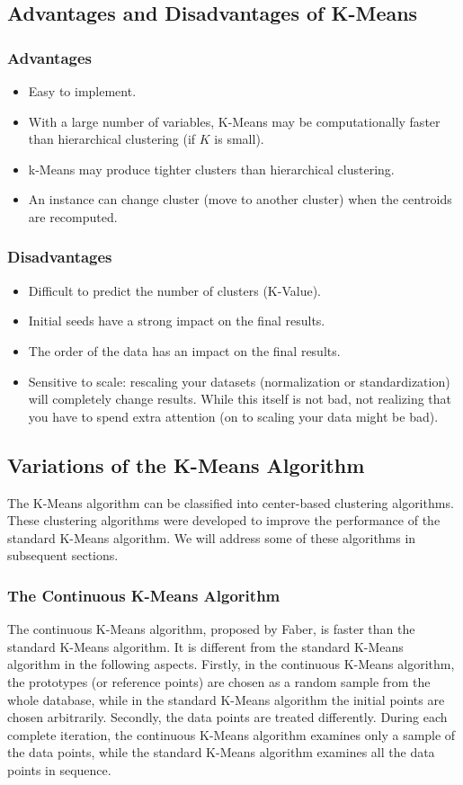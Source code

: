 \documentclass[12pt,a4paper]{article}
\begin{document}
\subsection{Advantages and Disadvantages of K-Means}
\subsubsection{Advantages}
\begin{itemize}
\item Easy to implement.
\item With a large number of variables, K-Means may be computationally faster than hierarchical clustering (if $K$ is small). 
\item k-Means may produce tighter clusters than hierarchical clustering.
\item An instance can change cluster (move to another cluster) when the centroids are recomputed.
\end{itemize}
\subsubsection{Disadvantages}
\begin{itemize}
\item Difficult to predict the number of clusters (K-Value).
\item Initial seeds have a strong impact on the final results.
\item The order of the data has an impact on the final results.
\item Sensitive to scale: rescaling your datasets (normalization or standardization) will completely change results. While this itself is not bad, not realizing that you have to spend extra attention (on to scaling your data might be bad).
\end{itemize}

\subsection{Variations of the K-Means Algorithm}
The K-Means algorithm can be classified into center-based clustering algorithms. These clustering algorithms were developed to improve the performance of the standard K-Means algorithm\cite{gan2007data}. We will address some of these algorithms in subsequent sections.
\subsubsection{The Continuous K-Means Algorithm}
The continuous K-Means algorithm, proposed by Faber, is faster than the standard K-Means algorithm. It is different from the standard K-Means algorithm in the following aspects. Firstly, in the continuous K-Means algorithm, the prototypes (or reference points) are chosen as a random sample from the whole database, while in the standard K-Means algorithm the initial points are chosen arbitrarily. Secondly, the data points are treated differently. During each complete iteration, the continuous K-Means algorithm examines only a sample of the data points, while the standard K-Means algorithm examines all the data points in sequence.
\end{document}
